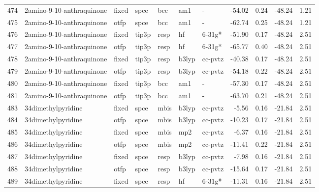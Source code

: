 \begin{tabular}{lllllllrrrr}
474 &     2amino-9-10-anthraquinone &  fixed &   spce &    bcc &     am1 &            - &      -54.02 &     0.24 &      -48.24 &      1.21 \\
475 &     2amino-9-10-anthraquinone &   otfp &   spce &    bcc &     am1 &            - &      -62.74 &     0.25 &      -48.24 &      1.21 \\
476 &     2amino-9-10-anthraquinone &  fixed &  tip3p &   resp &      hf &       6-31g* &      -51.90 &     0.17 &      -48.24 &      2.51 \\
477 &     2amino-9-10-anthraquinone &   otfp &  tip3p &   resp &      hf &       6-31g* &      -65.77 &     0.40 &      -48.24 &      2.51 \\
478 &     2amino-9-10-anthraquinone &  fixed &  tip3p &   resp &   b3lyp &      cc-pvtz &      -40.38 &     0.17 &      -48.24 &      2.51 \\
479 &     2amino-9-10-anthraquinone &   otfp &  tip3p &   resp &   b3lyp &      cc-pvtz &      -54.18 &     0.22 &      -48.24 &      2.51 \\
480 &     2amino-9-10-anthraquinone &  fixed &  tip3p &    bcc &     am1 &            - &      -57.30 &     0.17 &      -48.24 &      2.51 \\
481 &     2amino-9-10-anthraquinone &   otfp &  tip3p &    bcc &     am1 &            - &      -63.70 &     0.21 &      -48.24 &      2.51 \\
483 &            34dimethylpyridine &  fixed &   spce &   mbis &   b3lyp &      cc-pvtz &       -5.56 &     0.16 &      -21.84 &      2.51 \\
484 &            34dimethylpyridine &   otfp &   spce &   mbis &   b3lyp &      cc-pvtz &      -10.23 &     0.17 &      -21.84 &      2.51 \\
485 &            34dimethylpyridine &  fixed &   spce &   mbis &     mp2 &      cc-pvtz &       -6.37 &     0.16 &      -21.84 &      2.51 \\
486 &            34dimethylpyridine &   otfp &   spce &   mbis &     mp2 &      cc-pvtz &      -11.41 &     0.22 &      -21.84 &      2.51 \\
487 &            34dimethylpyridine &  fixed &   spce &   resp &   b3lyp &      cc-pvtz &       -7.98 &     0.16 &      -21.84 &      2.51 \\
488 &            34dimethylpyridine &   otfp &   spce &   resp &   b3lyp &      cc-pvtz &      -15.64 &     0.17 &      -21.84 &      2.51 \\
489 &            34dimethylpyridine &  fixed &   spce &   resp &      hf &       6-31g* &      -11.31 &     0.16 &      -21.84 &      2.51 \\

\end{tabular}
